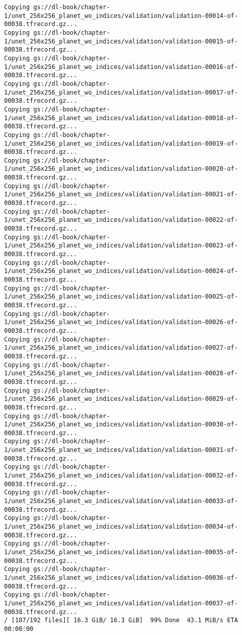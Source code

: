 \documentclass[
  letterpaper,
  DIV=11,
  numbers=noendperiod]{scrreprt}
\begin{document}
\begin{verbatim}
Copying gs://dl-book/chapter-1/unet_256x256_planet_wo_indices/validation/validation-00014-of-00038.tfrecord.gz...
Copying gs://dl-book/chapter-1/unet_256x256_planet_wo_indices/validation/validation-00015-of-00038.tfrecord.gz...
Copying gs://dl-book/chapter-1/unet_256x256_planet_wo_indices/validation/validation-00016-of-00038.tfrecord.gz...
Copying gs://dl-book/chapter-1/unet_256x256_planet_wo_indices/validation/validation-00017-of-00038.tfrecord.gz...
Copying gs://dl-book/chapter-1/unet_256x256_planet_wo_indices/validation/validation-00018-of-00038.tfrecord.gz...
Copying gs://dl-book/chapter-1/unet_256x256_planet_wo_indices/validation/validation-00019-of-00038.tfrecord.gz...
Copying gs://dl-book/chapter-1/unet_256x256_planet_wo_indices/validation/validation-00020-of-00038.tfrecord.gz...
Copying gs://dl-book/chapter-1/unet_256x256_planet_wo_indices/validation/validation-00021-of-00038.tfrecord.gz...
Copying gs://dl-book/chapter-1/unet_256x256_planet_wo_indices/validation/validation-00022-of-00038.tfrecord.gz...
Copying gs://dl-book/chapter-1/unet_256x256_planet_wo_indices/validation/validation-00023-of-00038.tfrecord.gz...
Copying gs://dl-book/chapter-1/unet_256x256_planet_wo_indices/validation/validation-00024-of-00038.tfrecord.gz...
Copying gs://dl-book/chapter-1/unet_256x256_planet_wo_indices/validation/validation-00025-of-00038.tfrecord.gz...
Copying gs://dl-book/chapter-1/unet_256x256_planet_wo_indices/validation/validation-00026-of-00038.tfrecord.gz...
Copying gs://dl-book/chapter-1/unet_256x256_planet_wo_indices/validation/validation-00027-of-00038.tfrecord.gz...
Copying gs://dl-book/chapter-1/unet_256x256_planet_wo_indices/validation/validation-00028-of-00038.tfrecord.gz...
Copying gs://dl-book/chapter-1/unet_256x256_planet_wo_indices/validation/validation-00029-of-00038.tfrecord.gz...
Copying gs://dl-book/chapter-1/unet_256x256_planet_wo_indices/validation/validation-00030-of-00038.tfrecord.gz...
Copying gs://dl-book/chapter-1/unet_256x256_planet_wo_indices/validation/validation-00031-of-00038.tfrecord.gz...
Copying gs://dl-book/chapter-1/unet_256x256_planet_wo_indices/validation/validation-00032-of-00038.tfrecord.gz...
Copying gs://dl-book/chapter-1/unet_256x256_planet_wo_indices/validation/validation-00033-of-00038.tfrecord.gz...
Copying gs://dl-book/chapter-1/unet_256x256_planet_wo_indices/validation/validation-00034-of-00038.tfrecord.gz...
Copying gs://dl-book/chapter-1/unet_256x256_planet_wo_indices/validation/validation-00035-of-00038.tfrecord.gz...
Copying gs://dl-book/chapter-1/unet_256x256_planet_wo_indices/validation/validation-00036-of-00038.tfrecord.gz...
Copying gs://dl-book/chapter-1/unet_256x256_planet_wo_indices/validation/validation-00037-of-00038.tfrecord.gz...
/ [187/192 files][ 16.3 GiB/ 16.3 GiB]  99% Done  43.1 MiB/s ETA 00:00:00       
\end{verbatim}
\end{document}
